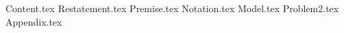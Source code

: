\documentclass{article}     %
\title{}
\author{}
\begin{document}
{Content.tex}
{Restatement.tex}
{Premise.tex}
{Notation.tex}
{Model.tex}
{Problem2.tex}
{Appendix.tex}
\end{document}
